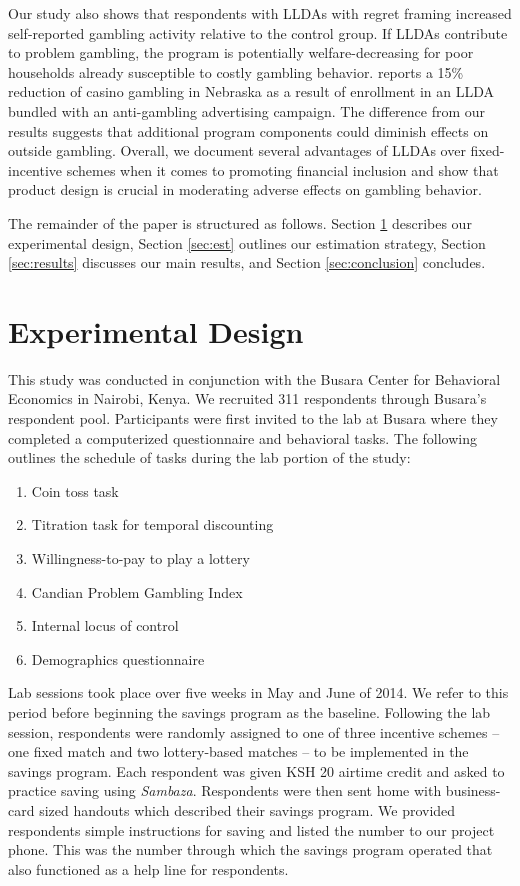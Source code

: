\documentclass[10pt]{article}
\begin{document}
	Our study also shows that respondents with LLDAs with regret framing increased self-reported gambling activity relative to the control group. If LLDAs contribute to problem gambling, the program is potentially welfare-decreasing for poor households already susceptible to costly gambling behavior.  reports a 15\% reduction of casino gambling in Nebraska as a result of enrollment in an LLDA bundled with an anti-gambling advertising campaign. The difference from our results suggests that additional program components could diminish effects on outside gambling. Overall, we document several advantages of LLDAs over fixed-incentive schemes when it comes to promoting financial inclusion and show that product design is crucial in moderating adverse effects on gambling behavior.

	The remainder of the paper is structured as follows. Section \ref{sec:design} describes our experimental design, Section \ref{sec:est} outlines our estimation strategy, Section \ref{sec:results} discusses our main results, and Section \ref{sec:conclusion} concludes.

\section{Experimental Design} \label{sec:design}

	This study was conducted in conjunction with the Busara Center for Behavioral Economics in Nairobi, Kenya. We recruited 311 respondents through Busara’s respondent pool. Participants were first invited to the lab at Busara where they completed a computerized questionnaire and behavioral tasks. The following outlines the schedule of tasks during the lab portion of the study:

	\begin{enumerate}
	\item Coin toss task 
	\item Titration task for temporal discounting 
	\item Willingness-to-pay to play a lottery
	\item Candian Problem Gambling Index 
	\item Internal locus of control 
	\item Demographics questionnaire
	\end{enumerate}

	Lab sessions took place over five weeks in May and June of 2014. We refer to this period before beginning the savings program as the baseline. Following the lab session, respondents were randomly assigned to one of three incentive schemes -- one fixed match and two lottery-based matches -- to be implemented in the savings program. Each respondent was given KSH 20 airtime credit and asked to practice saving using \textit{Sambaza}. Respondents were then sent home with business-card sized handouts which described their savings program. We provided respondents simple instructions for saving and listed the number to our project phone. This was the number through which the savings program operated that also functioned as a help line for respondents.
\end{document}
